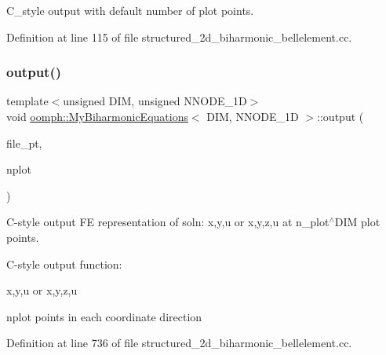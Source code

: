 C\+\_\+style output with default number of plot points. 



Definition at line 115 of file structured\+\_\+2d\+\_\+biharmonic\+\_\+bellelement.\+cc.

\mbox{\label{classoomph_1_1MyBiharmonicEquations_a898e272a1af66eacb3ebe5ac2fbe7749}} 
\subsubsection{\texorpdfstring{output()}{output()}\hspace{0.1cm}{\footnotesize\ttfamily [4/4]}}
{\footnotesize\ttfamily template$<$unsigned D\+IM, unsigned N\+N\+O\+D\+E\+\_\+1D$>$ \\
void \hyperlink{classoomph_1_1MyBiharmonicEquations}{oomph\+::\+My\+Biharmonic\+Equations}$<$ D\+IM, N\+N\+O\+D\+E\+\_\+1D $>$\+::output (\begin{DoxyParamCaption}\item[{F\+I\+LE $\ast$}]{file\+\_\+pt,  }\item[{const unsigned \&}]{nplot }\end{DoxyParamCaption})}



C-\/style output FE representation of soln\+: x,y,u or x,y,z,u at n\+\_\+plot$^\wedge$\+D\+IM plot points. 

C-\/style output function\+:

x,y,u or x,y,z,u

nplot points in each coordinate direction 

Definition at line 736 of file structured\+\_\+2d\+\_\+biharmonic\+\_\+bellelement.\+cc.

\mbox{\label{classoomph_1_1MyBiharmonicEquations_a0f45f28eae4d25ddd9e53a769c3626a3}} 

